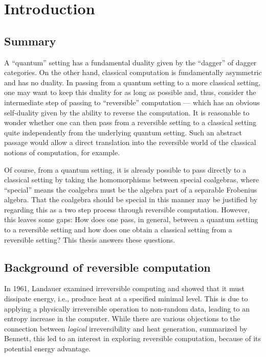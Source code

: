 \chapter{Introduction}\label{chap:introduction}
\section{Summary}\label{sec:summary}
A ``quantum'' setting has a fundamental duality given by the ``dagger'' of dagger
categories\cite{selinger05:dagger,abramsky05:abstractscalars}. On the other hand, classical
computation is fundamentally asymmetric and has no duality. In passing from a quantum setting to a more classical setting, one
may want to keep this duality for as long as possible and, thus, consider the intermediate step of
passing to ``reversible'' computation --- which has an obvious self-duality given by the ability to
reverse the computation. It is reasonable to
wonder whether one can then pass from a reversible setting to a classical setting quite
independently from the underlying quantum setting. Such an abstract
passage would allow a direct translation into the reversible world of the classical notions of
computation, for example.

Of course, from a quantum setting, it is already possible to pass directly to a classical setting by
taking the homomorphisms between special coalgebras, where ``special'' means the coalgebra must be
the algebra part of a separable Frobenius algebra. That the coalgebra should be special in this manner
may be justified by regarding this as a two step process through reversible computation. However,
this leaves some gaps: How does one pass, in general, between a quantum setting to a reversible
setting and how does one obtain a classical setting from a reversible setting? This thesis answers
these questions.
\section{Background of reversible computation}
\label{sec:background}

In 1961, Landauer\cite{landauer1961irreversibility} examined irreversible computing
and showed that it must dissipate energy, i.e., produce heat at a specified minimal level. This is
due to applying a physically irreversible operation to non-random data, leading to an entropy
increase in the computer. While there are various objections to the connection between
\emph{logical} irreversibility and heat generation, summarized by Bennett\cite{bennett2003notes},
this led to an interest in exploring reversible computation, because of its potential energy advantage.

